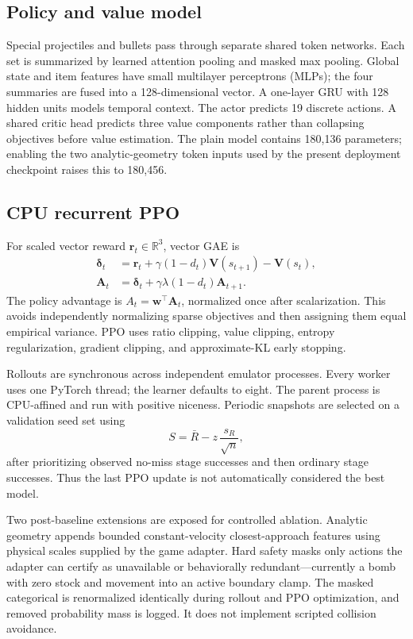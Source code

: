 \documentclass[10pt]{article}
\begin{document}
\subsection{Policy and value model}

Special projectiles and bullets pass through separate shared token networks.
Each set is summarized by learned attention pooling and masked max pooling.
Global state and item features have small multilayer perceptrons (MLPs); the
four summaries are fused into a 128-dimensional vector.  A one-layer GRU with
128 hidden units models temporal context.  The actor predicts 19 discrete
actions.  A shared critic head predicts three value components rather than
collapsing objectives before value estimation.  The plain model contains
180,136 parameters; enabling the two analytic-geometry token inputs used by the
present deployment checkpoint raises this to 180,456.

\subsection{CPU recurrent PPO}

For scaled vector reward $\mathbf{r}_t\in\mathbb{R}^3$, vector GAE is
\begin{align}
  \boldsymbol{\delta}_t &= \mathbf{r}_t
  + \gamma(1-d_t)\mathbf{V}(s_{t+1}) - \mathbf{V}(s_t),\\
  \mathbf{A}_t &= \boldsymbol{\delta}_t
  + \gamma\lambda(1-d_t)\mathbf{A}_{t+1}.
\end{align}
The policy advantage is $A_t=\mathbf{w}^{\top}\mathbf{A}_t$, normalized once
after scalarization.  This avoids independently normalizing sparse objectives
and then assigning them equal empirical variance.  PPO uses ratio clipping,
value clipping, entropy regularization, gradient clipping, and approximate-KL
early stopping.

Rollouts are synchronous across independent emulator processes.  Every worker
uses one PyTorch thread; the learner defaults to eight.  The parent process is
CPU-affined and run with positive niceness.  Periodic snapshots are selected on
a validation seed set using
\begin{equation}
  S = \bar{R} - z\,\frac{s_R}{\sqrt{n}},
\end{equation}
after prioritizing observed no-miss stage successes and then ordinary stage
successes.  Thus the last PPO update is not automatically considered the best
model.

Two post-baseline extensions are exposed for controlled ablation.  Analytic
geometry appends bounded constant-velocity closest-approach features using
physical scales supplied by the game adapter.  Hard safety masks only actions
the adapter can certify as unavailable or behaviorally redundant---currently a
bomb with zero stock and movement into an active boundary clamp.  The masked
categorical is renormalized identically during rollout and PPO optimization,
and removed probability mass is logged.  It does not implement scripted
collision avoidance.
\end{document}
